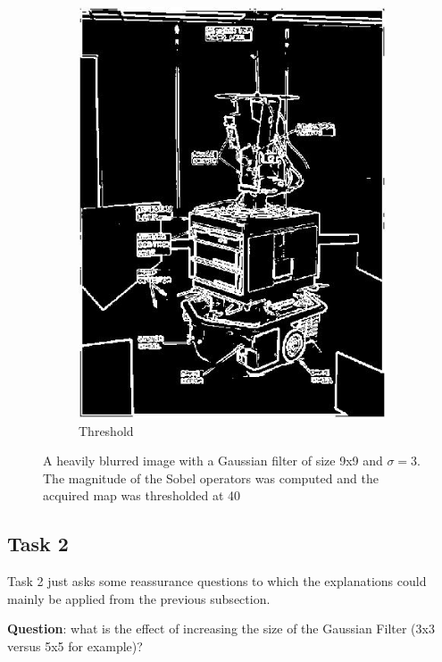 \documentclass[lettersize,journal]{IEEEtran}
\begin{document}
\begin{figure}[h]
\begin{subfigure}[h]{0.155\textwidth}
        \includegraphics[width=\linewidth]{heavy_blur_9x9_sigma_3_edges}
        \caption{Threshold}  
    \end{subfigure}
    \caption{A heavily blurred image with a Gaussian filter of size 9x9 and $\sigma=3$. The magnitude of the Sobel operators was computed and the acquired map was thresholded at 40}
    \label{fig:5}
\end{figure}

\subsection{Task 2}
\noindent Task 2 just asks some reassurance questions to which the explanations could mainly be applied from the previous subsection.

\hfill

\noindent\textbf{Question}: what is the effect of increasing the size of the Gaussian Filter (3x3 versus 5x5 for example)?
\end{document}
